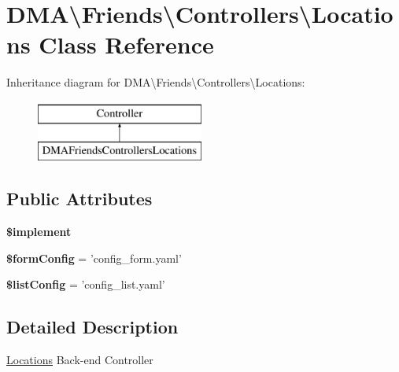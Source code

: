 \hypertarget{classDMA_1_1Friends_1_1Controllers_1_1Locations}{\section{D\-M\-A\textbackslash{}Friends\textbackslash{}Controllers\textbackslash{}Locations Class Reference}
\label{classDMA_1_1Friends_1_1Controllers_1_1Locations}
}
Inheritance diagram for D\-M\-A\textbackslash{}Friends\textbackslash{}Controllers\textbackslash{}Locations\-:\begin{figure}[H]
\begin{center}
\leavevmode
\includegraphics[height=2.000000cm]{d2/d9c/classDMA_1_1Friends_1_1Controllers_1_1Locations}
\end{center}
\end{figure}
\subsection*{Public Attributes}
\begin{DoxyCompactItemize}
\item 
{\bfseries \$implement}
\item 
\hypertarget{classDMA_1_1Friends_1_1Controllers_1_1Locations_a8a769617e49a5e862fa8633b75467223}{{\bfseries \$form\-Config} = 'config\-\_\-form.\-yaml'}\label{classDMA_1_1Friends_1_1Controllers_1_1Locations_a8a769617e49a5e862fa8633b75467223}

\item 
\hypertarget{classDMA_1_1Friends_1_1Controllers_1_1Locations_a54b41dd09d63dafca0bff7528a8c27e1}{{\bfseries \$list\-Config} = 'config\-\_\-list.\-yaml'}\label{classDMA_1_1Friends_1_1Controllers_1_1Locations_a54b41dd09d63dafca0bff7528a8c27e1}

\end{DoxyCompactItemize}


\subsection{Detailed Description}
\hyperlink{classDMA_1_1Friends_1_1Controllers_1_1Locations}{Locations} Back-\/end Controller 

